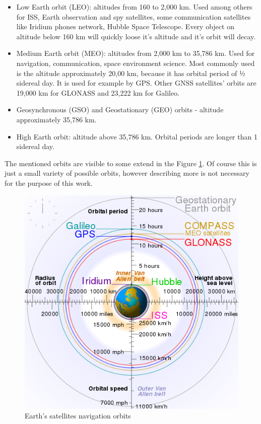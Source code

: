\documentclass[12pt,a4paper,oneside]{article}
\begin{document}
\begin{itemize}

\item Low Earth orbit (LEO): altitudes from 160 to 2,000 km. Used among others for ISS, Earth observation and spy satellites, some communication satellites like Iridium phones network, Hubble Space Telescope. Every object on altitude below 160 km will quickly loose it's altitude and it's orbit will decay.
\item Medium Earth orbit (MEO): altitudes from 2,000 km to 35,786 km. Used for navigation, communication, space environment science. Most commonly used is the altitude approximately 20,00 km, because it has orbital period of ½ sidereal day. It is used for example by GPS. Other GNSS satellites' orbits are 19,000 km for GLONASS and 23,222 km for Galileo.
\item Geosynchronous (GSO) and Geostationary (GEO) orbits - altitude approximately 35,786 km.
\item High Earth orbit: altitude above 35,786 km. Orbital periods are longer than 1 sidereal day.

\end{itemize}

The mentioned orbits are visible to some extend in the Figure \ref{fig:orbits-image}. Of course this is just a small variety of possible orbits, however describing more is not necessary for the purpose of this work.


\begin{figure}[!htbp]
\includegraphics[scale=0.7]{Comparison_satellite_navigation_orbits.png}
\centering
\caption{Earth's satellites navigation orbits \cite{orbits-image}}
\label{fig:orbits-image}
\end{figure}
\end{document}
